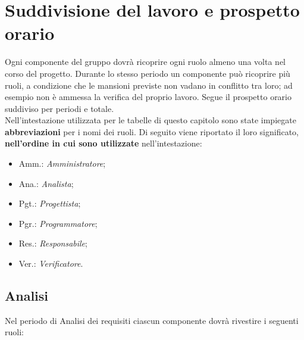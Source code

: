 \section{Suddivisione del lavoro e prospetto orario}
Ogni componente del gruppo dovrà ricoprire ogni ruolo almeno una volta nel corso del progetto.
Durante lo stesso periodo un componente può ricoprire più ruoli, a condizione che le mansioni previste non vadano in conflitto tra loro; ad esempio non è ammessa la verifica del proprio lavoro.
Segue il prospetto orario suddiviso per periodi e totale. \\

Nell'intestazione utilizzata per le tabelle di questo capitolo sono state impiegate \textbf{abbreviazioni} per i nomi dei ruoli.
Di seguito viene riportato il loro significato, \textbf{nell'ordine in cui sono utilizzate} nell'intestazione:
\begin{itemize}
\item Amm.: \textit{Amministratore};
\item Ana.: \textit{Analista};
\item Pgt.: \textit{Progettista};
\item Pgr.: \textit{Programmatore};
\item Res.: \textit{Responsabile};
\item Ver.: \textit{Verificatore}.
\end{itemize}

\pagebreak
\subsection{Analisi}
Nel periodo di Analisi dei requisiti ciascun componente dovrà rivestire i seguenti ruoli:

